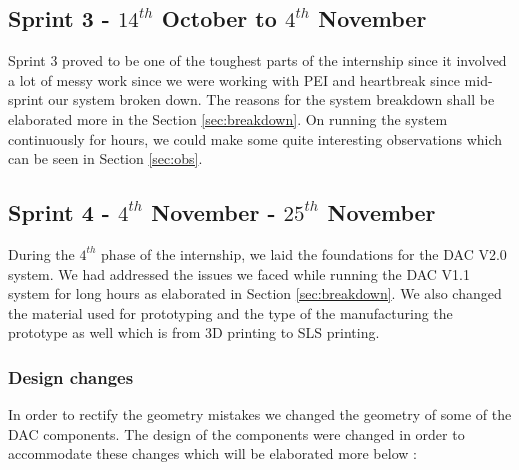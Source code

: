 \subsection{Sprint 3 - $14^{th}$ October to $4^{th}$ November}
\label{sec:sprint3}

Sprint 3 proved to be one of the toughest parts of the internship since it involved a lot of messy work since we were working with PEI and heartbreak since mid-sprint our system broken down. The reasons for the system breakdown shall be elaborated more in the Section \ref{sec:breakdown}. On running the system continuously for hours, we could make some quite interesting observations which can be seen in Section \ref{sec:obs}.  


\subsection{Sprint 4 - $4^{th}$ November - $25^{th}$ November}
\label{sec:sprint4}

During the $4^{th}$ phase of the internship, we laid the foundations for the DAC V2.0 system. We had addressed the issues we faced while running the DAC V1.1 system for long hours as elaborated in Section \ref{sec:breakdown}. We also changed the material used for prototyping and the type of the manufacturing the prototype as well which is from 3D printing to SLS printing. 

\subsubsection{Design changes}
In order to rectify the geometry mistakes we changed the geometry of some of the DAC components. The design of the components were changed in order to accommodate these changes which will be elaborated more below :

